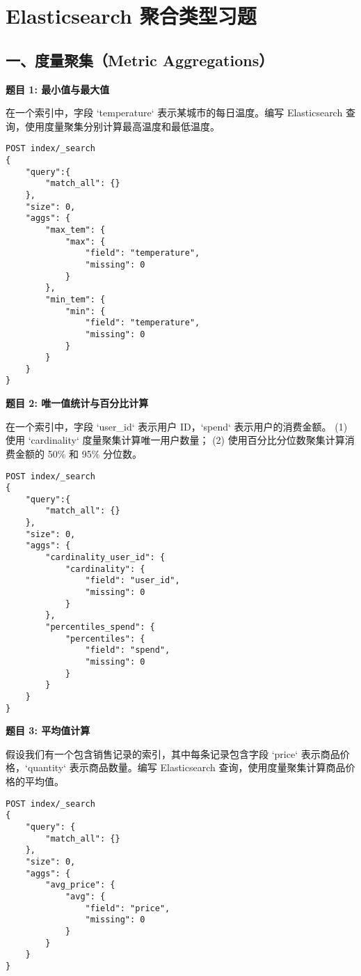 \documentclass[12pt]{article}
\begin{document}
\section*{Elasticsearch 聚合类型习题}

\subsection*{一、度量聚集（Metric Aggregations）}

\textbf{题目 1: 最小值与最大值}  

在一个索引中，字段 `temperature` 表示某城市的每日温度。编写 Elasticsearch 查询，使用度量聚集分别计算最高温度和最低温度。

\begin{verbatim}
POST index/_search
{
    "query":{
        "match_all": {}
    },
    "size": 0,
    "aggs": {
        "max_tem": {
            "max": {
                "field": "temperature",
                "missing": 0
            }
        },
        "min_tem": {
            "min": {
                "field": "temperature",
                "missing": 0
            }
        }
    }
}
\end{verbatim}

\textbf{题目 2: 唯一值统计与百分比计算}  

在一个索引中，字段 `user\_id` 表示用户 ID，`spend` 表示用户的消费金额。  
(1) 使用 `cardinality` 度量聚集计算唯一用户数量；  
(2) 使用百分比分位数聚集计算消费金额的 50\% 和 95\% 分位数。

\begin{verbatim}
POST index/_search
{
    "query":{
        "match_all": {}
    },
    "size": 0,
    "aggs": {
        "cardinality_user_id": {
            "cardinality": {
                "field": "user_id",
                "missing": 0
            }
        },
        "percentiles_spend": {
            "percentiles": {
                "field": "spend",
                "missing": 0
            }
        }
    }
}
\end{verbatim}


\textbf{题目 3: 平均值计算}  

假设我们有一个包含销售记录的索引，其中每条记录包含字段 `price` 表示商品价格，`quantity` 表示商品数量。编写 Elasticsearch 查询，使用度量聚集计算商品价格的平均值。

\begin{verbatim}
POST index/_search
{
    "query": {
        "match_all": {}
    },
    "size": 0,
    "aggs": {
        "avg_price": {
            "avg": {
                "field": "price",
                "missing": 0
            }
        }
    }
}
\end{verbatim}
\end{document}
